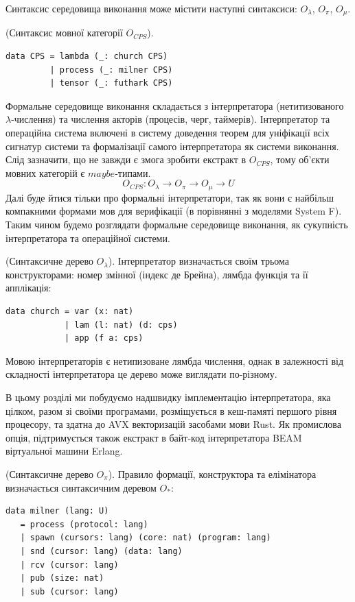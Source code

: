 Синтаксис середовища виконання може містити наступні синтаксиси:
$O_\lambda$, $O_\pi$, $O_\mu$.

\begin{definition} (Синтаксис мовної категорії $O_{CPS}$).
\begin{lstlisting}
data CPS = lambda (_: church CPS)
         | process (_: milner CPS)
         | tensor (_: futhark CPS)
\end{lstlisting}
\end{definition}

Формальне середовище виконання складається з інтерпретатора
(нетитизованого $\lambda$-числення) та числення акторів (процесів, черг, таймерів).
Інтерпретатор та операційна система включені в систему доведення теорем
для уніфікації всіх сигнатур системи та формалізації самого інтерпретатора
як системи виконання. Слід зазначити, що не
завжди є змога зробити екстракт в $O_{CPS}$, тому об'єкти мовних
категорій є $maybe$-типами.
$$
O_{CPS}: O_\lambda \rightarrow O_\pi \rightarrow O_\mu \rightarrow U
$$
Далі буде йтися тільки про формальні інтерпретатори,
так як вони є найбільш компакними формами мов для
верифікації (в порівнянні з моделями System F).
Таким чином будемо розглядати формальне середовище виконання, як
сукупність інтерпретатора та операційної системи.

\begin{definition} (Синтаксичне дерево $O_\lambda$). Інтерпретатор визначається
своїм трьома конструкторами: номер змінної (індекс де Брейна),
лямбда функція та її апплікація:
\begin{lstlisting}
data church = var (x: nat)
            | lam (l: nat) (d: cps)
            | app (f a: cps)
\end{lstlisting}
Мовою інтерпретаторів є нетипизоване лямбда числення, однак в залежності
від складності інтерпретатора це дерево може виглядати по-різному.
\end{definition}

В цьому розділі ми побудуємо надшвидку імплементацію інтерпретатора,
яка цілком, разом зі своїми програмами, розміщується в кеш-памяті
першого рівня процесору, та здатна до AVX векторизацій засобами мови Rust.
Як промислова опція, підтримується також екстракт
в байт-код інтерпретатора BEAM віртуальної машини Erlang.

\begin{definition} (Синтаксичне дерево $O_\pi$).
Правило формації, конструктора та елімінатора визначається синтаксичним деревом $O_*$:
\begin{lstlisting}
data milner (lang: U)
   = process (protocol: lang)
   | spawn (cursors: lang) (core: nat) (program: lang)
   | snd (cursor: lang) (data: lang)
   | rcv (cursor: lang)
   | pub (size: nat)
   | sub (cursor: lang)
\end{lstlisting}
\end{definition}

